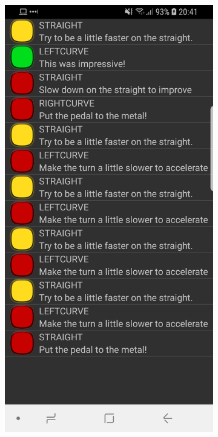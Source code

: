 \begin{figure}[H]
\begin{subfigure}[c]{0.32\textwidth}
	\end{subfigure}
	\hfill
	\begin{subfigure}[c]{0.32\textwidth}
		\includegraphics[width=\textwidth]{Pictures/App/SectionScreen1.jpg}
		

\end{subfigure}
\end{figure}
